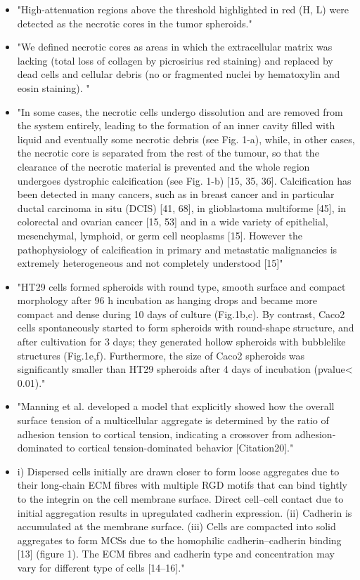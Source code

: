 \documentclass[11pt,a4paper]{article}
\begin{document}
\begin{itemize}
\item "High-attenuation regions above the threshold highlighted in red (H, L) were detected as the necrotic cores in the tumor spheroids."\cite{Huang2017}
\item "We defined necrotic cores as areas in which the extracellular matrix was lacking (total loss of collagen by picrosirius red staining) and replaced by dead cells and cellular debris (no or fragmented nuclei by hematoxylin and
eosin staining). "\cite{Thim2010}
\item "In some cases, the necrotic cells undergo dissolution
and are removed from the system entirely, leading to the formation of an inner cavity filled with liquid and
eventually some necrotic debris (see Fig. 1-a), while, in other cases, the necrotic core is separated from the
rest of the tumour, so that the clearance of the necrotic material is prevented and the whole region undergoes
dystrophic calcification (see Fig. 1-b) [15, 35, 36]. Calcification has been detected in many cancers, such as
in breast cancer and in particular ductal carcinoma in situ (DCIS) [41, 68], in glioblastoma multiforme [45],
in colorectal and ovarian cancer [15, 53] and in a wide variety of epithelial, mesenchymal, lymphoid, or germ
cell neoplasms [15]. However the pathophysiology of calcification in primary and metastatic malignancies is
extremely heterogeneous and not completely understood [15]"\cite{Giverso2018}
\item "HT29 cells formed spheroids with round type, smooth surface and compact morphology after 96 h incubation as hanging drops and became more compact and dense during 10 days of culture (Fig.1b,c). By contrast, Caco2 cells spontaneously started to form spheroids with round-shape structure, and after cultivation for 3 days; they generated hollow spheroids with bubblelike structures (Fig.1e,f). Furthermore, the size of Caco2 spheroids was significantly smaller than HT29 spheroids after 4 days of incubation (pvalue< 0.01)."\cite{Gheytanchi2021}
\item "Manning et al. developed a model that explicitly showed how the overall surface tension of a multicellular aggregate is determined by the ratio of adhesion tension to cortical tension, indicating a crossover from adhesion-dominated to cortical tension-dominated behavior [Citation20]."\cite{Boot2021}
\item i) Dispersed cells initially are drawn closer to form loose aggregates due to their long-chain ECM fibres with multiple RGD motifs that can bind tightly to the integrin on the cell membrane surface. Direct cell–cell contact due to initial aggregation results in upregulated cadherin expression. (ii) Cadherin is accumulated at the membrane surface. (iii) Cells are compacted into solid aggregates to form MCSs due to the homophilic cadherin–cadherin binding [13] (figure 1). The ECM fibres and cadherin type and concentration may vary for different type of cells [14–16]."\cite{Cui2017}

\end{itemize}
\end{document}

